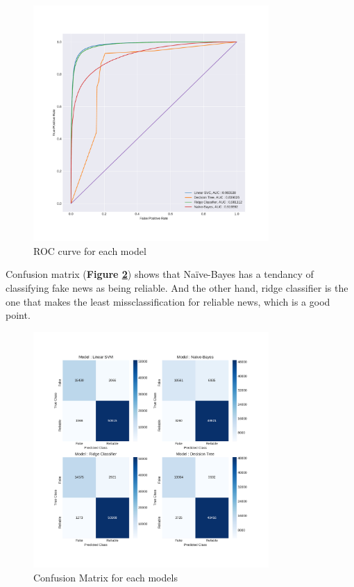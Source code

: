 \begin{figure}
	\centering
	\includegraphics[width=0.8\textwidth]{images/chapitre3/roc2}
	\caption{ROC curve for each model}
	\label{fig:chap3:roc2}
\end{figure}

Confusion matrix (\textbf{Figure \ref{fig:chap3:confMat2}}) shows that Na\"{i}ve-Bayes has a tendancy of classifying fake news as being reliable. And the other hand, ridge classifier is the one that makes the least missclassification for reliable news, which is a good point. \\

\begin{figure}
	\centering
	\includegraphics[width=0.8\textwidth]{images/chapitre3/test_fake_confMat}
	\caption{Confusion Matrix for each models}
	\label{fig:chap3:confMat2}
\end{figure}


